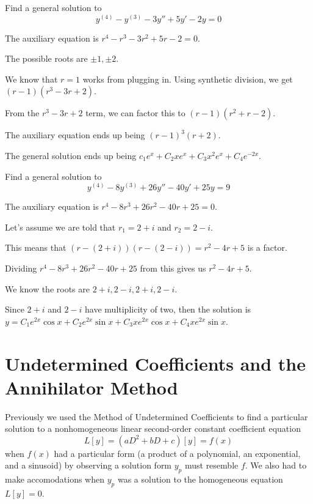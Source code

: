 \documentclass[../diffeq.tex]{subfiles}
\begin{document}
\begin{example}
    Find a general solution to 
    \[ y^{(4)}-y^{(3)}-3y''+5y'-2y =0 \]

    The auxiliary equation is $r^4-r^3-3r^2+5r-2=0$.

    The possible roots are $\pm 1,\pm 2$.

    We know that $r=1$ works from plugging in. Using synthetic division, we get $(r-1)(r^3-3r+2)$. 

    From the $r^3-3r+2$ term, we can factor this to $(r-1)(r^2+r-2)$.

    The auxiliary equation ends up being $(r-1)^3(r+2)$.

    The general solution ends up being $c_1e^x+C_2xe^x+C_3x^2e^x+C_4e^{-2x}$.
\end{example}
\pagebreak
\begin{example}
    Find a general solution to 
    \[ y^{(4)}-8y^{(3)}+26y''-40y'+25y=9 \]

    The auxiliary equation is $r^4-8r^3+26r^2-40r+25=0$.

    Let's assume we are told that $r_1=2+i$ and $r_2=2-i$.

    This means that $(r-(2+i))(r-(2-i)) = r^2-4r+5$ is a factor.

    Dividing $r^4-8r^3+26r^2-40r+25$ from this gives us $r^2-4r+5$. 

    We know the roots are $2+i, 2-i, 2+i, 2-i$.

    Since $2+i$ and $2-i$ have multiplicity of two, then the solution is $y=C_1e^{2x}\cos x+C_2e^{2x}\sin x+C_3xe^{2x}\cos x+C_4xe^{2x}\sin x$.
\end{example}

\section{Undetermined Coefficients and the Annihilator Method}
Previously we used the Method of Undetermined Coefficients to find a particular solution to a nonhomogeneous linear second-order constant coefficient equation 
\[ L[y] = (aD^2+bD+c)[y] = f(x) \]
when $f(x)$ had a particular form (a product of a polynomial, an exponential, and a sinusoid) by observing a solution form $y_p$ must resemble $f$. We also had to make accomodations when $y_p$ was a solution to the homogeneous equation $L[y]=0$.
\end{document}
